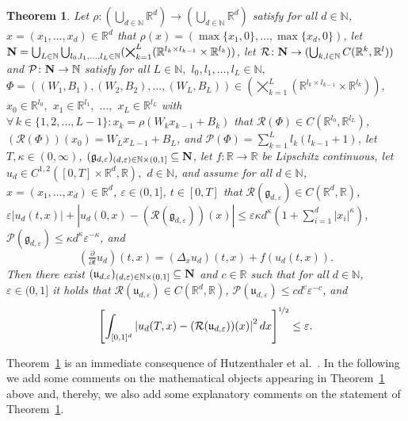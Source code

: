 \documentclass[12pt,AutoFakeBold,AutoFakeSlant]{article}
\newtheorem{theorem}{Theorem}
\theoremstyle{definition}
\newcommand{\R}{\mathbb{R}}
\newcommand{\N}{\mathbb{N}}
\begin{document}
	\begin{theorem}
	\label{thm:DNN_nonlinear_PDEs}
	Let $ \rho \colon (\bigcup_{d\in\N}\R^d) \to (\bigcup_{d\in\N}\R^d)$ 
	satisfy for all $d\in\N $, $ x = (x_1,\dots,x_d) \in \R^d $ 
	that 
	$
	\rho(x) = ( \max\{x_1,0\}, \allowbreak \dots, \allowbreak\max\{x_d,0\} ) 
	$, 
	let $
	{\bf N} = 
	\bigcup_{ L \in \N }
	\bigcup_{ l_0, l_1, \dots, l_L \in \N }(
		\bigtimes_{ k = 1 }^L ( \R^{ l_k \times l_{k-1} } \times \R^{l_k} )
	) 
	$, 
	let 
	$ \mathcal{R} \colon {\bf N} \to (\bigcup_{k,l\in\N}C(\R^k,\R^l)) $ 
	and 
	$
	\mathcal{P} \colon {\bf N} \to \N 
	$ 
	satisfy for all $L\in\N,$ $l_0,l_1,\dots,l_L\in\N,$ $\Phi = ((W_1,B_1),\allowbreak(W_2,B_2),\allowbreak\dots,\allowbreak(W_L,B_L)) \in (\bigtimes_{k=1}^L\allowbreak (\R^{l_k\times l_{k-1}}\times \R^{l_k})),$ $x_0\in \R^{l_0},$ $x_1\in\R^{l_1},$ $\dots,$ $x_L\in\R^{l_L}$ with $\forall\, k\in \{1,2,\dots,L-1\}\colon x_k = \rho( W_k x_{ k - 1 } + B_k ) $ that
	$
	\mathcal{R}(\Phi) \in C(\R^{l_0},\R^{l_{L}})
	$, 
	$
	(\mathcal{R}(\Phi))(x_0) = W_Lx_{L-1}+B_L
	$, 
	and
	$
	\mathcal{P}(\Phi) = \sum_{k=1}^L l_k(l_{k-1}+1)
	$, 
	let $ T, \kappa \in (0,\infty) $, 
	$ (\mathfrak{g}_{d,\varepsilon} )_{ (d,\varepsilon) \in \N \times (0,1] } \subseteq {\bf N} $, 
	let $f\colon\R \to \R$ be Lipschitz continuous, 
	let $u_d \in C^{1,2}([0,T]\times \R^d,\R),$ $d\in\N$, 
	and assume for all 
	$ d \in \N $, $ x = (x_1, \dots, x_d) \in \R^d $, 
	$ \varepsilon \in (0,1] $, $ t \in [0,T] $ 
	that 
	$
	\mathcal{R}(\mathfrak{g}_{d,\varepsilon}) \in C(\R^d,\R) 
	$, 
	$ 
	\varepsilon | u_d(t,x) | 
	+ \allowbreak 
	| u_d(0,x) \allowbreak - ( \mathcal{R}(\mathfrak{g}_{d,\varepsilon}) )(x) | 
	\le \varepsilon \kappa d^\kappa (1 + \sum_{ i = 1 }^d | x_i |^\kappa ) 
	$, 
	$
	\mathcal{P}(\mathfrak{g}_{d,\varepsilon}) \le \kappa d^\kappa \varepsilon^{-\kappa} 
	$, 
	and 
	\begin{equation}\label{eq:1a}
	(\tfrac{\partial}{\partial t} u_d)(t,x) = (\Delta_x u_d)(t,x) + f(u_d(t,x)) .
	\end{equation}
	Then there exist 
	$ (\mathfrak{u}_{d,\varepsilon})_{(d,\varepsilon)\in \N\times(0,1] }\subseteq {\bf N} $
	and $ c \in \R $ 
	such that for all $ d \in \N $, $ \varepsilon \in (0,1] $ 
	it holds that 
	$ \mathcal{R}( \mathfrak{u}_{d,\varepsilon} ) \in C( \R^d, \R ) $, 
	$ \mathcal{P}( \mathfrak{u}_{d,\varepsilon} ) \le c d^c \varepsilon^{-c} $, 
	and
	\begin{equation}\label{eq:2a}
	\left[ 
		\int_{ [0,1]^d } 
		\left| 
			u_d(T,x) - (\mathcal{R}(\mathfrak{u}_{d,\varepsilon}))(x) 
		\right|^2 
		dx
	\right]^{\nicefrac{1}{2}} \le \varepsilon.
	\end{equation}
	\end{theorem}
	Theorem~\ref{thm:DNN_nonlinear_PDEs} is an immediate 
	consequence of 
	Hutzenthaler et al.~\cite[Theorem~1.1]{hutzenthaler2020proof}. 
	In the following we add some comments 
	on the mathematical objects 
	appearing in Theorem~\ref{thm:DNN_nonlinear_PDEs} above and, thereby, we 
	also add some explanatory comments on the statement of Theorem~\ref{thm:DNN_nonlinear_PDEs}.
\end{document}
